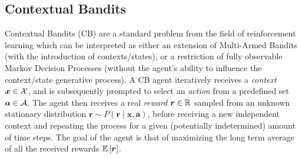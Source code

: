 \documentclass[11pt]{article}
\begin{document}
\subsection{Contextual Bandits}

Contextual Bandits (CB) are a standard problem from the field of reinforcement
learning which can be interpreted as either an extension of Multi-Armed Bandits
(with the introduction of contexts/states), or a restriction of fully
observable Markov Decision Processes (without the agent's ability to influence
the context/state generative process).  A CB agent iteratively receives
a \emph{context} $\bm x\in{\mathcal{X}}$, and is subsequently prompted to select an
\emph{action} from a predefined set $\bm a\in{\mathcal{A}}$.  The agent then receives
a real \emph{reward} $\bm r\in{\mathbb{R}}$ sampled from an unknown stationary
distribution $\bm r\sim P(\bm r\mid \bm x, \bm a)$, before receiving a new
independent context and repeating the process for a given (potentially
indetermined) amount of time steps.  The goal of the agent is that of
maximizing the long term average of all the received rewards ${\mathbb{E}}\left[\bm
r\right]$.  
\end{document}
